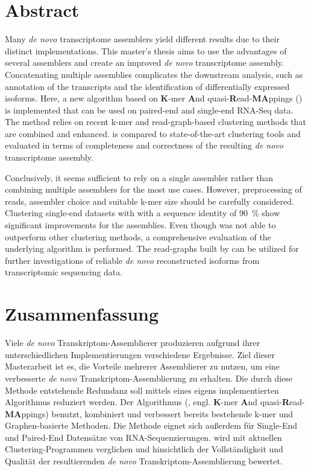 \documentclass[12pt,a4paper,english]{article}
\begin{document}
\section*{Abstract}
	Many \textit{de novo} transcriptome assemblers yield different results due to their distinct implementations. This master's thesis aims to use the advantages of several assemblers and create an improved \textit{de novo} transcriptome assembly. Concatenating multiple assemblies complicates the downstream analysis, such as annotation of the transcripts and the identification of differentially expressed isoforms. Here, a new algorithm based on \textbf{K}-mer \textbf{A}nd quasi-\textbf{R}ead-\textbf{MA}ppings (\karma) is implemented that can be used on paired-end and single-end RNA-Seq data. The method relies on recent k-mer and read-graph-based clustering methods that are combined and enhanced. \karma is compared to state-of-the-art clustering tools and evaluated in terms of completeness and correctness of the resulting \textit{de novo} transcriptome assembly.
	
	Conclusively, it seems sufficient to rely on a single assembler rather than combining multiple assemblers for the most use cases. However, preprocessing of reads, assembler choice and suitable k-mer size should be carefully considered. Clustering single-end datasets with \cdhit with a sequence identity of 90~\% show significant improvements for the assemblies.
	Even though \karma was not able to outperform other clustering methods, a comprehensive evaluation of the underlying algorithm is performed. The read-graphs built by \karma can be utilized for further investigations of reliable \textit{de novo} reconstructed isoforms from transcriptomic sequencing data.

\newpage
\section*{Zusammenfassung}
    Viele \textit{de novo} Transkriptom-Assemblierer produzieren aufgrund ihrer unterschiedlichen Implementierungen verschiedene Ergebnisse. Ziel dieser Masterarbeit ist es, die Vorteile mehrerer Assemblierer zu nutzen, um eine verbesserte \textit{de novo} Transkriptom-Assemblierung zu erhalten. Die durch diese Methode entstehende Redundanz soll mittels eines eigens implementierten Algorithmus reduziert werden. Der Algorithmus (\karma, engl. \textbf{K}-mer \textbf{A}nd quasi-\textbf{R}ead-\textbf{MA}ppings) benutzt, kombiniert und verbessert bereits bestehende k-mer und Graphen-basierte Methoden.
    Die Methode eignet sich außerdem für Single-End und Paired-End Datensätze von RNA-Sequenzierungen.
    \karma wird mit aktuellen Clustering-Programmen verglichen und hinsichtlich der Vollständigkeit und Qualität der resultierenden \textit{de novo} Transkriptom-Assemblierung bewertet.
    
\end{document}
